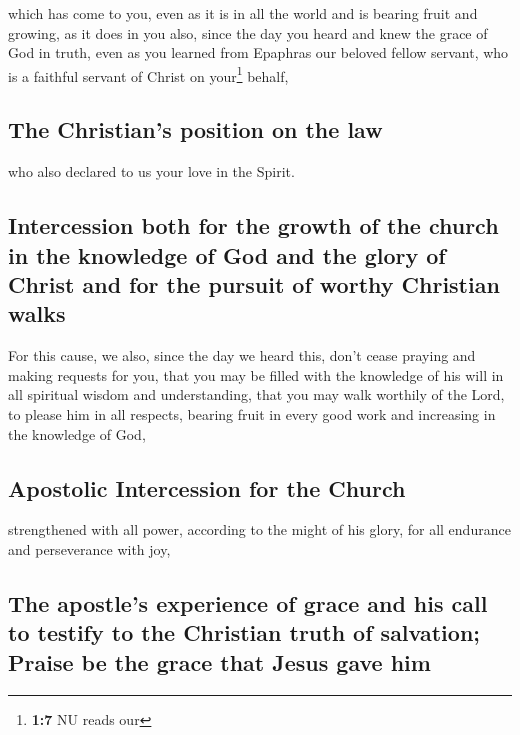  which has come to you, even as it is in all the world and
is bearing fruit and growing, as it does in you also, since the day you
heard and knew the grace of God in truth,  even as you
learned from Epaphras our beloved fellow servant, who is a faithful
servant of Christ on your\footnote{\textbf{1:7} NU reads our} behalf,

\hypertarget{the-christians-position-on-the-law}{%
\subsection{The Christian's position on the
law}\label{the-christians-position-on-the-law}}

 who also declared to us your love in the Spirit.

\hypertarget{intercession-both-for-the-growth-of-the-church-in-the-knowledge-of-god-and-the-glory-of-christ-and-for-the-pursuit-of-worthy-christian-walks}{%
\subsection{Intercession both for the growth of the church in the
knowledge of God and the glory of Christ and for the pursuit of worthy
Christian
walks}\label{intercession-both-for-the-growth-of-the-church-in-the-knowledge-of-god-and-the-glory-of-christ-and-for-the-pursuit-of-worthy-christian-walks}}

 For this cause, we also, since the day we heard this,
don't cease praying and making requests for you, that you may be filled
with the knowledge of his will in all spiritual wisdom and
understanding,  that you may walk worthily of the Lord,
to please him in all respects, bearing fruit in every good work and
increasing in the knowledge of God,

\hypertarget{apostolic-intercession-for-the-church}{%
\subsection{Apostolic Intercession for the
Church}\label{apostolic-intercession-for-the-church}}

 strengthened with all power, according to the might of
his glory, for all endurance and perseverance with joy,

\hypertarget{the-apostles-experience-of-grace-and-his-call-to-testify-to-the-christian-truth-of-salvation-praise-be-the-grace-that-jesus-gave-him}{%
\subsection{The apostle's experience of grace and his call to testify to
the Christian truth of salvation; Praise be the grace that Jesus gave
him}\label{the-apostles-experience-of-grace-and-his-call-to-testify-to-the-christian-truth-of-salvation-praise-be-the-grace-that-jesus-gave-him}}

